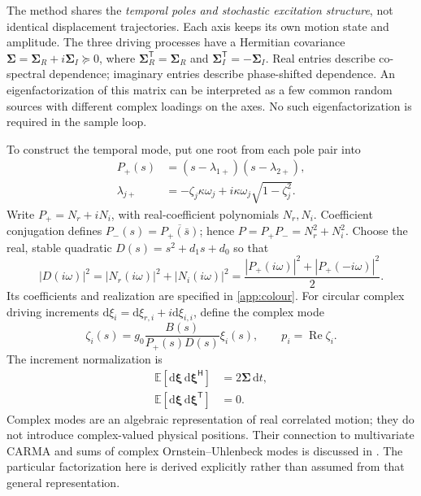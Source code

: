\documentclass[conference]{IEEEtran}
\newcommand{\vc}[1]{\bm{#1}}
\newcommand{\mt}[1]{\bm{#1}}
\newcommand{\E}{\mathbb E}
\newcommand{\tr}{^{\mathsf T}}
\newcommand{\herm}{^{\mathsf H}}
\newcommand{\dd}{\mathrm d}
\DeclareMathOperator{\Rea}{Re}
\begin{document}
The method shares the \emph{temporal poles and stochastic excitation
structure}, not identical displacement trajectories. Each axis keeps its
own motion state and amplitude. The three driving processes have a
Hermitian covariance $\mt\Sigma=\mt\Sigma_R+i\mt\Sigma_I\succeq0$,
where $\mt\Sigma_R\tr=\mt\Sigma_R$ and
$\mt\Sigma_I\tr=-\mt\Sigma_I$. Real entries describe co-spectral
dependence; imaginary entries describe phase-shifted dependence. An
eigenfactorization of this matrix can be interpreted as a few common
random sources with different complex loadings on the axes. No such
eigenfactorization is required in the sample loop.

To construct the temporal mode, put one root from each pole pair into
\begin{align}
 P_+(s)&=(s-\lambda_{1+})(s-\lambda_{2+}),\nonumber\\
 \lambda_{j+}&=-\zeta_j\kappa\omega_j
         +i\kappa\omega_j\sqrt{1-\zeta_j^2}.
 \label{eq:pplus}
\end{align}
Write $P_+=N_r+iN_i$, with real-coefficient polynomials $N_r,N_i$.
Coefficient conjugation defines $P_-(s)=\overline{P_+(\bar s)}$; hence
$P=P_+P_-=N_r^2+N_i^2$. Choose the real, stable quadratic
$D(s)=s^2+d_1s+d_0$ so that
\begin{equation}
 |D(i\omega)|^2=|N_r(i\omega)|^2+|N_i(i\omega)|^2
 =\frac{|P_+(i\omega)|^2+|P_+(-i\omega)|^2}{2}.
 \label{eq:D}
\end{equation}
Its coefficients and realization are specified in \cref{app:colour}.
For circular complex driving increments $\dd\xi_i=\dd\xi_{r,i}+i\dd\xi_{i,i}$,
define the complex mode
\begin{equation}
 \zeta_i(s)=g_0\frac{B(s)}{P_+(s)D(s)}\xi_i(s),\qquad
 p_i=\Rea\zeta_i.
 \label{eq:complex}
\end{equation}
The increment normalization is
\begin{align}
 \E[\dd\vc\xi\,\dd\vc\xi\herm]&=2\mt\Sigma\,\dd t,\nonumber\\
 \E[\dd\vc\xi\,\dd\vc\xi\tr]&=0.
 \label{eq:circular}
\end{align}
Complex modes are an algebraic representation of real correlated motion;
they do not introduce complex-valued physical positions. Their connection
to multivariate CARMA and sums of complex Ornstein--Uhlenbeck modes is
discussed in \cite{fasen}. The particular factorization here is derived
explicitly rather than assumed from that general representation.
\end{document}
